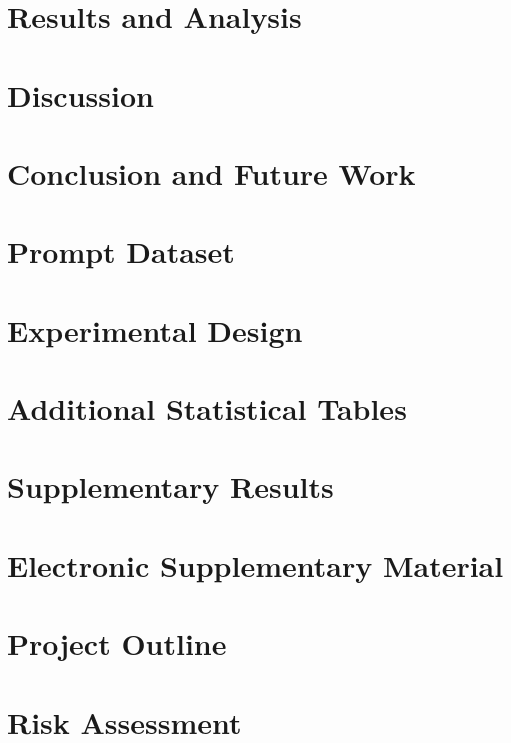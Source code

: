 \documentclass[12pt,a4paper,oneside]{report}
\begin{document}
\chapter{Results and Analysis}

\FloatBarrier

\chapter{Discussion}

\FloatBarrier

\chapter{Conclusion and Future Work}

\FloatBarrier


\clearpage
{}



\appendix

\chapter{Prompt Dataset}

\FloatBarrier

\chapter{Experimental Design}

\FloatBarrier

\chapter{Additional Statistical Tables}

\FloatBarrier

\chapter{Supplementary Results}

\FloatBarrier

\chapter{Electronic Supplementary Material}

\FloatBarrier

\chapter{Project Outline}

\FloatBarrier

\chapter{Risk Assessment}

\FloatBarrier
\end{document}
